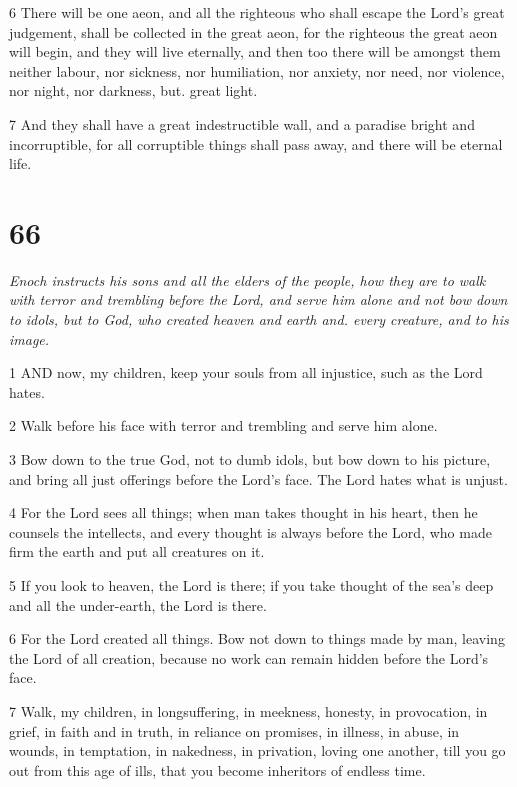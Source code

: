 \par 6 There will be one aeon, and all the righteous who shall escape the Lord's great judgement, shall be collected in the great aeon, for the righteous the great aeon will begin, and they will live eternally, and then too there will be amongst them neither labour, nor sickness, nor humiliation, nor anxiety, nor need, nor violence, nor night, nor darkness, but. great light.

\par 7 And they shall have a great indestructible wall, and a paradise bright and incorruptible, for all corruptible things shall pass away, and there will be eternal life.

\chapter{66}

\par \textit{Enoch instructs his sons and all the elders of the people, how they are to walk with terror and trembling before the Lord, and serve him alone and not bow down to idols, but to God, who created heaven and earth and. every creature, and to his image.}

\par 1 AND now, my children, keep your souls from all injustice, such as the Lord hates.

\par 2 Walk before his face with terror and trembling and serve him alone.

\par 3 Bow down to the true God, not to dumb idols, but bow down to his picture, and bring all just offerings before the Lord's face. The Lord hates what is unjust.

\par 4 For the Lord sees all things; when man takes thought in his heart, then he counsels the intellects, and every thought is always before the Lord, who made firm the earth and put all creatures on it.

\par 5 If you look to heaven, the Lord is there; if you take thought of the sea's deep and all the under-earth, the Lord is there.

\par 6 For the Lord created all things. Bow not down to things made by man, leaving the Lord of all creation, because no work can remain hidden before the Lord's face.

\par 7 Walk, my children, in longsuffering, in meekness, honesty, in provocation, in grief, in faith and in truth, in reliance on promises, in illness, in abuse, in wounds, in temptation, in nakedness, in privation, loving one another, till you go out from this age of ills, that you become inheritors of endless time.

